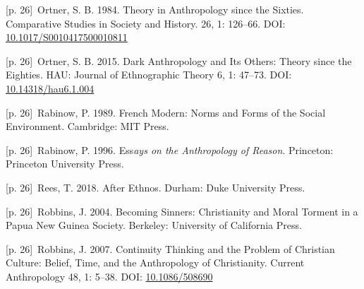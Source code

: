 \documentclass[10pt,a4paper]{article}
\begin{document}
\noindent\begin{minipage}[t]{\linewidth}{\scriptsize\color{gray} [p. 26]}\ Ortner, S. B. 1984. Theory in Anthropology since the Sixties. Comparative Studies in Society and History. 26, 1: 126–66. DOI: \url{10.1017/S0010417500010811}\par\end{minipage}\par
\noindent\begin{minipage}[t]{\linewidth}{\scriptsize\color{gray} [p. 26]}\ Ortner, S. B. 2015. Dark Anthropology and Its Others: Theory since the Eighties. HAU: Journal of Ethnographic Theory 6, 1: 47–73. DOI: \url{10.14318/hau6.1.004}\par\end{minipage}\par
\noindent\begin{minipage}[t]{\linewidth}{\scriptsize\color{gray} [p. 26]}\ Rabinow, P. 1989. French Modern: Norms and Forms of the Social Environment. Cambridge: MIT Press.\par\end{minipage}\par
\noindent\begin{minipage}[t]{\linewidth}{\scriptsize\color{gray} [p. 26]}\ Rabinow, P. 1996. Ess\textit{ays on the Anthropology of Reason}. Princeton: Princeton University Press.\par\end{minipage}\par
\noindent\begin{minipage}[t]{\linewidth}{\scriptsize\color{gray} [p. 26]}\ Rees, T. 2018. After Ethnos. Durham: Duke University Press.\par\end{minipage}\par
\noindent\begin{minipage}[t]{\linewidth}{\scriptsize\color{gray} [p. 26]}\ Robbins, J. 2004. Becoming Sinners: Christianity and Moral Torment in a Papua New Guinea Society. Berkeley: University of California Press.\par\end{minipage}\par
\noindent\begin{minipage}[t]{\linewidth}{\scriptsize\color{gray} [p. 26]}\ Robbins, J. 2007. Continuity Thinking and the Problem of Christian Culture: Belief, Time, and the Anthropology of Christianity. Current Anthropology 48, 1: 5–38. DOI: \url{10.1086/508690}\par\end{minipage}\par
\end{document}
